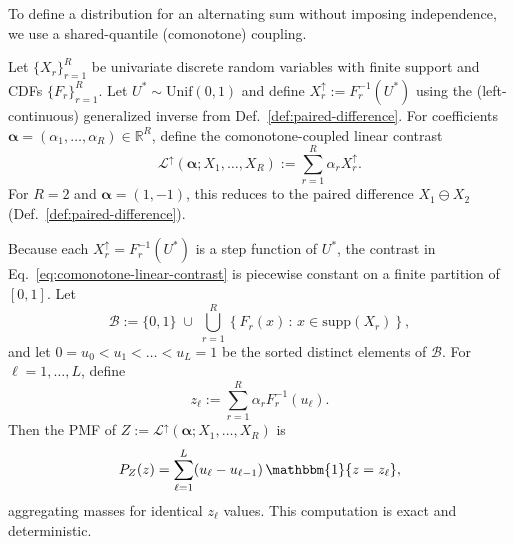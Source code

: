 To define a distribution for an alternating sum without imposing independence,
we use a shared-quantile (comonotone) coupling.

\begin{definition}
\label{def:comonotone-contrast}
Let $\{X_r\}_{r=1}^R$ be univariate discrete random variables with finite
support and CDFs $\{F_r\}_{r=1}^R$. Let $U^\ast\sim\mathrm{Unif}(0,1)$ and define
$X_r^\uparrow := F_r^{-1}(U^\ast)$ using the (left-continuous) generalized
inverse from Def.~\ref{def:paired-difference}. For coefficients
$\boldsymbol{\alpha}=(\alpha_1,\dots,\alpha_R)\in\mathbb{R}^R$, define the
comonotone-coupled linear contrast
\begin{equation}
\label{eq:comonotone-linear-contrast}
\mathcal{L}^\uparrow(\boldsymbol{\alpha};X_1,\dots,X_R)
:=
\sum_{r=1}^R \alpha_r X_r^\uparrow.
\end{equation}
For $R=2$ and $\boldsymbol{\alpha}=(1,-1)$, this reduces to the paired
difference $X_1\ominus X_2$ (Def.~\ref{def:paired-difference}).
\end{definition}

Because each $X_r^\uparrow=F_r^{-1}(U^\ast)$ is a step function of $U^\ast$,
the contrast in Eq.~\eqref{eq:comonotone-linear-contrast} is piecewise constant
on a finite partition of $[0,1]$.
Let
\[
\mathcal{B}
:=
\{0,1\}\;\cup\;
\bigcup_{r=1}^R
\left\{
F_r(x)\,:\, x\in\mathrm{supp}(X_r)
\right\},
\]
and let $0=u_0<u_1<\dots<u_L=1$ be the sorted distinct elements of $\mathcal{B}$.
For $\ell=1,\dots,L$, define
\[
z_\ell
:=
\sum_{r=1}^R \alpha_r F_r^{-1}(u_\ell).
\]
Then the PMF of $Z:=\mathcal{L}^\uparrow(\boldsymbol{\alpha};X_1,\dots,X_R)$ is
\begin{equation}
\label{eq:comonotone-contrast-pmf}
P_Z(z)
=
\sum_{\ell=1}^L
(u_\ell-u_{\ell-1})\,
\mathbbm{1}\{z=z_\ell\},
\end{equation}
aggregating masses for identical $z_\ell$ values. This computation is exact and
deterministic.

